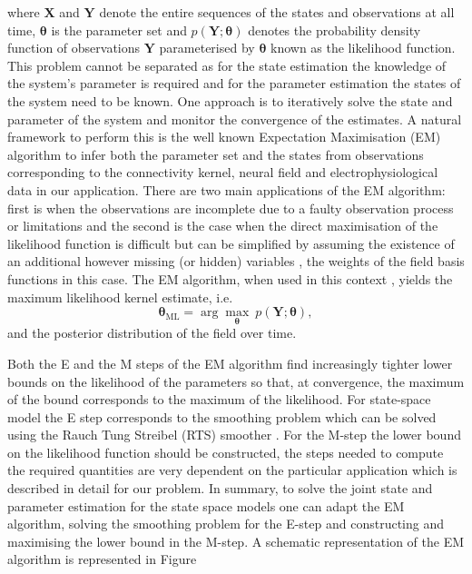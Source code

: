 \documentclass[11pt,draftcls,onecolumn,peerreview]{IEEEtran}
\begin{document}
where $\mathbf X$ and $\mathbf Y$ denote the entire sequences of the states and observations at all time, $\boldsymbol\theta$ is the parameter set and $p(\mathbf Y;\boldsymbol\theta)$ denotes the probability density function of observations $\mathbf Y$ parameterised  by $\boldsymbol\theta$ known as the likelihood function. This problem cannot be separated as for the state estimation the knowledge of the system's parameter is required and for the parameter estimation the states of the system need to be known. One approach is to iteratively solve the state and parameter of the system and monitor the convergence of the estimates. A natural framework to perform this is the well known Expectation Maximisation (EM) algorithm \cite{Dempster1977,Shumway2000} to infer both the parameter set and the states from observations corresponding to the connectivity kernel, neural field and electrophysiological data in our application. There are two main applications of the EM algorithm:  first is when the observations are incomplete due to a faulty observation process or limitations and the second is the case when the direct maximisation of the likelihood function is difficult but can be simplified by assuming the existence of an additional however missing (or hidden) variables \cite{Bilmes1998}, the weights of the field basis functions in this case. The EM algorithm, when used in this context \cite{Dewar2009}, yields the maximum likelihood kernel estimate, i.e.
\begin{equation}
	\boldsymbol\theta_{\text{ML}}=\arg\max_{\boldsymbol\theta}~p(\mathbf Y;\boldsymbol\theta),
 \end{equation}   
and the posterior distribution of the field over time.

Both the E and the M steps of the EM algorithm find increasingly tighter lower bounds on the likelihood of the parameters so that, at convergence, the maximum of the bound corresponds to the maximum of the likelihood. For state-space model the E step corresponds to the smoothing problem which can be solved using the Rauch Tung Streibel (RTS) smoother \cite{RAUCH1965}. For the M-step the lower bound on the likelihood function should be constructed, the steps needed
to compute the required quantities are very dependent on the particular application which is described in detail for our problem. In summary, to solve the joint state and parameter estimation for the state space models one can adapt the EM algorithm, solving the smoothing problem for the E-step and constructing and maximising the lower bound in the M-step. A schematic representation of the EM algorithm is represented in Figure
\end{document}
